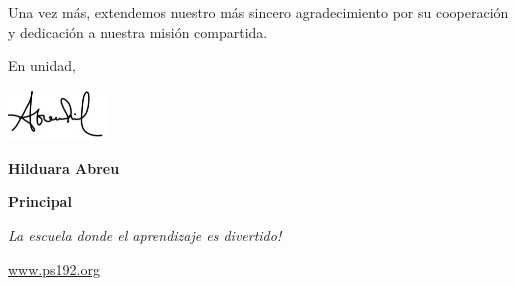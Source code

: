\documentclass[12pt,letterpaper]{article}
\begin{document}
Una vez más, extendemos nuestro más sincero agradecimiento por su cooperación y dedicación a nuestra misión compartida.

En unidad,

\includegraphics[width=0.2\textwidth]{hil_signature}

\textbf{Hilduara Abreu}

\textbf{Principal}

\textit{La escuela donde el aprendizaje es divertido!}

\url{www.ps192.org}
\end{document}
